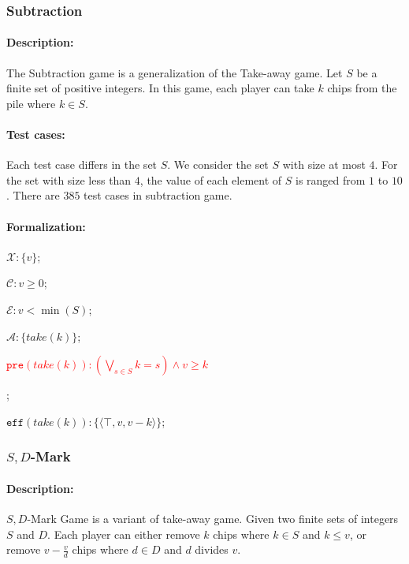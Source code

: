 \documentclass[review]{elsarticle}
\newcommand{\set}[1]{\{ #1 \}}
\newcommand{\tuple}[1]{\langle {#1} \rangle}
\newcommand{\true}{\top}
\newcommand{\statevar}{\mathcal{X}}
\newcommand{\act}{\mathcal{A}}
\newcommand{\constraint}{\mathcal{C}}
\newcommand{\estate}{\mathcal{E}}
\newcommand{\pre}{\mathtt{pre}}
\newcommand{\eff}{\mathtt{eff}}
\begin{document}
\subsubsection{Subtraction \protect\cite{Yag2001}}

\paragraph{Description:} 
The Subtraction game is a generalization of the Take-away game.
Let $S$ be a finite set of positive integers.
In this game, each player can take $k$ chips from the pile where $ k \in S$.

\paragraph{Test cases:}
Each test case differs in the set $S$. %
We consider the set $S$ with size at most $4$.
For the set with size less than $4$, the value of each element of $S$ is ranged from $1$ to $10$.
There are $385$ test cases in subtraction game.

\paragraph{Formalization:}

\begin{itemize}
	\item $\statevar: \set{v}$;
	\item $\constraint: v \ge 0 $;
	\item $\estate:  v < \min(S) $;
	\item $\act: \set{take(k)}$;
	\textcolor{red}{\item $\pre(take(k)) : (\bigvee_{s \in S} k = s) \land v \geq k$};
	\item $\eff(take(k)) : \set{\tuple{\true, v, v-k}}$;
\end{itemize}

\subsubsection{$S,D$-Mark \protect\cite{Sop2016}}

\paragraph{Description:}
$S, D$-Mark Game is a variant of take-away game.
Given two finite sets of integers $S$ and $D$. 
Each player can either remove $k$ chips where $k \in S$ and $k \le v$, or remove $v - \frac{v}{d}$ chips where $d \in D $ and $d$ divides $v$. 
\end{document}
